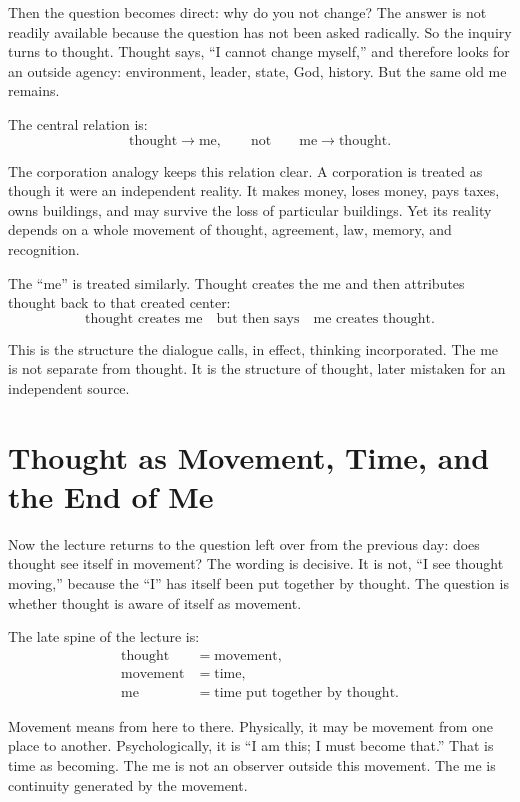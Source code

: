 Then the question becomes direct: why do you not change? The answer is not readily available because the question has not been asked radically. So the inquiry turns to thought. Thought says, ``I cannot change myself,'' and therefore looks for an outside agency: environment, leader, state, God, history. But the same old me remains.

The central relation is:
\begin{equation}
\text{thought} \longrightarrow \text{me},
\qquad
\text{not}
\qquad
\text{me} \longrightarrow \text{thought}.
\end{equation}

The corporation analogy keeps this relation clear. A corporation is treated as though it were an independent reality. It makes money, loses money, pays taxes, owns buildings, and may survive the loss of particular buildings. Yet its reality depends on a whole movement of thought, agreement, law, memory, and recognition.

The ``me'' is treated similarly. Thought creates the me and then attributes thought back to that created center:
\begin{equation}
\text{thought creates me}
\quad \text{but then says} \quad
\text{me creates thought}.
\end{equation}

This is the structure the dialogue calls, in effect, thinking incorporated. The me is not separate from thought. It is the structure of thought, later mistaken for an independent source.

\section{Thought as Movement, Time, and the End of Me}

Now the lecture returns to the question left over from the previous day: does thought see itself in movement? The wording is decisive. It is not, ``I see thought moving,'' because the ``I'' has itself been put together by thought. The question is whether thought is aware of itself as movement.

The late spine of the lecture is:
\begin{align}
\text{thought} &= \text{movement}, \\
\text{movement} &= \text{time}, \\
\text{me} &= \text{time put together by thought}.
\end{align}

Movement means from here to there. Physically, it may be movement from one place to another. Psychologically, it is ``I am this; I must become that.'' That is time as becoming. The me is not an observer outside this movement. The me is continuity generated by the movement.

